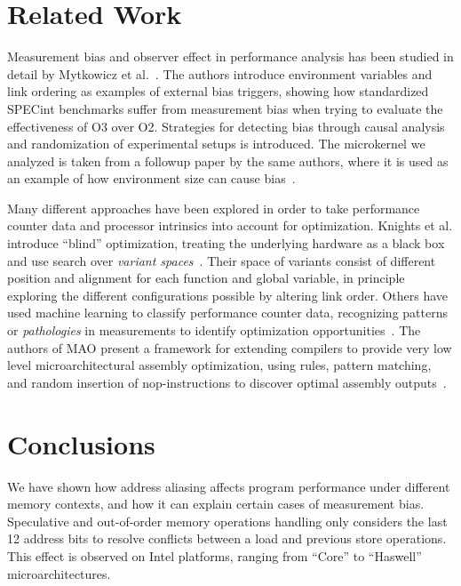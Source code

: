 \documentclass[10pt, conference, compsocconf]{IEEEtran}
\begin{document}
\section{Related Work}
\label{sec:related}
Measurement bias and observer effect in performance analysis has been studied in detail by Mytkowicz et al.~\cite{Mytkowicz:2008:OE&MB,Mytkowicz:2008:Easy}.
The authors introduce environment variables and link ordering as examples of external bias triggers, showing how standardized {\small SPECint} benchmarks suffer from measurement bias when trying to evaluate the effectiveness of O3 over O2. 
Strategies for detecting bias through causal analysis and randomization of experimental setups is introduced.
The microkernel we analyzed is taken from a followup paper by the same authors, where it is used as an example of how environment size can cause bias~\cite{Mytkowicz:2009:WrongData}.

Many different approaches have been explored in order to take performance counter data and processor intrinsics into account for optimization.
Knights et al. introduce ``blind'' optimization, treating the underlying hardware as a black box and use search over \emph{variant spaces}~\cite{Knights:2009:BlindOpt}.
Their space of variants consist of different position and alignment for each function and global variable, in principle exploring the different configurations possible by altering link order.
Others have used machine learning to classify performance counter data, recognizing patterns or \emph{pathologies} in measurements to identify optimization opportunities~\cite{Yoo:ADD}.
The authors of MAO present a framework for extending compilers to provide very low level microarchitectural assembly optimization, using rules, pattern matching, and random insertion of nop-instructions to discover optimal assembly outputs~\cite{Hundt:2011:MAO}.

\section{Conclusions}
\label{sec:conclusions}
We have shown how address aliasing affects program performance under different memory contexts, and how it can explain certain cases of measurement bias.
Speculative and out-of-order memory operations handling only considers the last 12 address bits to resolve conflicts between a load and previous store operations.
This effect is observed on Intel platforms, ranging from ``Core'' to ``Haswell'' microarchitectures.
\end{document}
